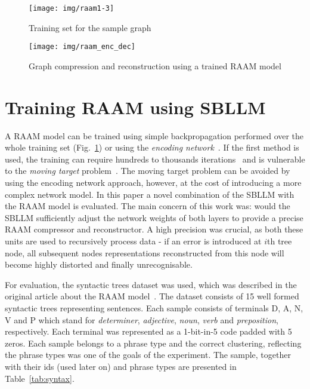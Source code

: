 \documentclass[]{spie}  %
\begin{document}
\begin{figure}
\begin{center}
	\texttt{[image: img/raam1-3]}
	\caption{Training set for the sample graph}
	\label{fig:raam1-3}
\end{center}
\end{figure}

\begin{figure}
\begin{center}
	\texttt{[image: img/raam\_enc\_dec]}
	\caption{Graph compression and reconstruction using a trained RAAM model}
	\label{fig:raam_enc_dec}
\end{center}
\end{figure}

\newpage

\section{Training RAAM using SBLLM}
A RAAM model can be trained using simple backpropagation performed over the whole training set (Fig.~\ref{fig:raam1-3}) or using the \emph{encoding network}~\cite{goulon2005hopfield}. If the first method is used, the training can require hundreds to thousands iterations~\cite{sperduti1994labelling} and is vulnerable to the \emph{moving target} problem~\cite{pollack1990recursive}. The moving target problem can be avoided by using the encoding network approach, however, at the cost of introducing a more complex network model. In this paper a novel combination of the SBLLM with the RAAM model is evaluated. The main concern of this work was: would the SBLLM sufficiently adjust the network weights of both layers to provide a precise RAAM compressor and reconstructor. A high precision was crucial, as both these units are used to recursively process data - if an error is introduced at $i$th tree node, all subsequent nodes representations reconstructed from this node will become highly distorted and finally unrecognisable.

For evaluation, the syntactic trees dataset was used, which was described in the original article about the RAAM model~\cite{pollack1990recursive}. The dataset consists of 15 well formed syntactic trees representing sentences. Each sample consists of terminals D, A, N, V and P which stand for \emph{determiner}, \emph{adjective}, \emph{noun}, \emph{verb} and \emph{preposition}, respectively. Each terminal was represented as a 1-bit-in-5 code padded with 5 zeros. Each sample belongs to a phrase type and the correct clustering, reflecting the phrase types was one of the goals of the experiment. The sample, together with their ids (used later on) and phrase types are presented in Table~\ref{tab:syntax}.
\end{document}
